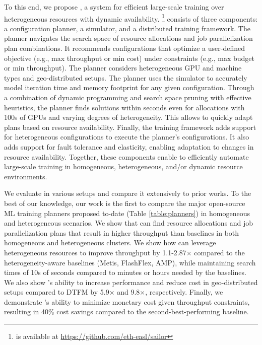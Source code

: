 To this end, we propose \textit{\sailor}, a system for efficient large-scale training over heterogeneous resources with dynamic availability. \sailor\footnote{\sailor is available at \href{https://github.com/eth-easl/sailor}{https://github.com/eth-easl/sailor}} consists of three components: a configuration planner, a simulator, and a distributed training framework. The \sailor planner navigates the search space of resource allocations and job parallelization plan combinations. It recommends configurations that optimize a user-defined objective (e.g., max throughput or min cost) under constraints (e.g., max budget or min throughput). The planner considers heterogeneous GPU and machine types and geo-distributed setups. The planner uses the simulator to accurately model iteration time and memory footprint for any given configuration. 
Through a combination of dynamic programming and search space pruning with effective heuristics, the planner finds solutions within seconds even for allocations with 100s of GPUs and varying degrees of heterogeneity. This allows \sailor to quickly adapt plans based on resource availability. Finally, the \sailor training framework adds support for heterogeneous configurations to execute the planner’s configurations. It also adds support for fault tolerance and elasticity, enabling adaptation to changes in resource availability. Together, these components enable \sailor to efficiently automate large-scale training in homogeneous, heterogeneous, and/or dynamic resource environments.

We evaluate \sailor in various setups and compare it extensively to prior works. 
To the best of our knowledge, our work is the first to compare the major open-source ML training planners proposed to-date (Table \ref{table:planners}) in homogeneous and heterogeneous scenarios. We show that \sailor can find resource allocations and job parallelization plans that result in higher throughput than baselines in both homogeneous and heterogeneous clusters.
We show how \sailor can leverage heterogeneous resources to improve throughput by 1.1-2.87$\times$ compared to the heterogeneity-aware baselines (Metis, FlashFlex, AMP), while maintaining search times of 10s of seconds compared to minutes or hours needed by the baselines. We also show \sailor's ability to increase performance and reduce cost in geo-distributed setups compared to DTFM by 5.9$\times$ and 9.8$\times$, respectively. Finally, we demonstrate \sailor's ability to minimize monetary cost given throughput constraints, resulting in 40\% cost savings compared to the second-best-performing baseline.